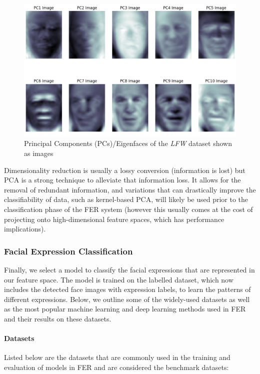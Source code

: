 \documentclass[12pt, a4paper]{article}
\newcommand{\np}
    {
    \vskip 0.4cm
    }
\begin{document}
\begin{figure}[H]
    \centering
    \includegraphics[scale=0.55]{images/eigenfaces.png}
    \caption{Principal Components (PCs)/Eigenfaces of the \textit{LFW} dataset shown as images}
    \label{fig:eigenfaces}
\end{figure}

Dimensionality reduction is usually a lossy conversion (information is lost) but PCA is a strong technique to alleviate that information loss. It allows for the removal of redundant information, and variations that can drastically improve the classifiability of data, such as kernel-based PCA, will likely be used prior to the classification phase of the FER system (however this usually comes at the cost of projecting onto high-dimensional feature spaces, which has performance implications).

\subsubsection{Facial Expression Classification}
\label{ferrr}
\np
Finally, we select a model to classify the facial expressions that are represented in our feature space. The model is trained on the labelled dataset, which now includes the detected face images with expression labels, to learn the patterns of different expressions. Below, we outline some of the widely-used datasets as well as the most popular machine learning and deep learning methods used in FER and their results on these datasets.

\paragraph{Datasets}
\label{datasets}
Listed below are the datasets that are commonly used in the training and evaluation of models in FER and are considered the benchmark datasets:
\end{document}

